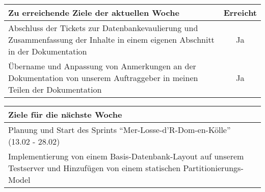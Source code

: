 \begin{tabularx}{\textwidth}{Xc}
    \arrayrulecolor{OliveGreen}
    \toprule
    {\bfseries Zu erreichende Ziele der aktuellen Woche} & {\bfseries Erreicht} \\
    \midrule[2pt]
    Abschluss der Tickets zur Datenbankevaulierung und Zusammenfassung der
    Inhalte in einem eigenen Abschnitt in der Dokumentation  &  Ja  \\
    \rowcolor{OliveGreen!15}
    Übername und Anpassung von Anmerkungen an der Dokumentation von unserem
    Auftraggeber in meinen Teilen der Dokumentation  &  Ja  \\
    \bottomrule[2pt]
\end{tabularx}
%
\vspace{1cm}
%
\begin{tabularx}{\textwidth}{Xc}
    \arrayrulecolor{OliveGreen}
    \toprule
    {\bfseries Ziele für die nächste Woche}              &                   \\
    \midrule[2pt]
    Planung und Start des Sprints ``Mer-Losse-d'R-Dom-en-Kölle''
    (13.02 \hyp{} 28.02)  &  \\
    \rowcolor{OliveGreen!15}
    Implementierung von einem Basis-Datenbank-Layout auf unserem Testserver
    und Hinzufügen von einem statischen Partitionierungs-Model  &  \\
\end{tabularx}
